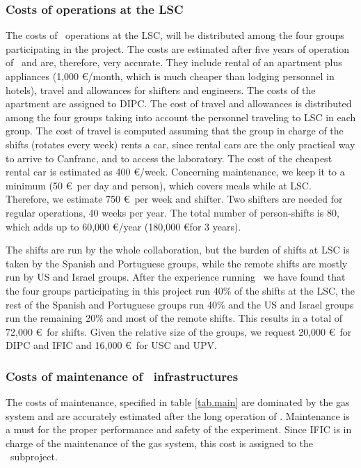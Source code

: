 \subsubsection{Costs of operations at the LSC}
The costs of \Next\ operations at the LSC, will be distributed among the four groups participating in the project. The costs are estimated after five years of operation of \New\ and are, therefore, very accurate. They include rental of an apartment plus appliances (1,000 \euro/month, which is much cheaper than lodging personnel in hotels), travel and allowances for shifters and engineers.  The costs of the apartment are assigned to DIPC. The cost of travel and allowances is distributed among the four groups taking into account the personnel traveling to LSC in each group. The cost of travel is computed assuming that the group in charge of the shifts (rotates every week) rents a car, since rental cars are the only practical way to arrive to Canfranc, and to access the laboratory. The cost of the cheapest rental car is estimated as 400 \euro/week. Concerning maintenance, we keep it to a minimum (50 \euro\ per day and person), which covers meals while at LSC. Therefore, we estimate 750 \euro\ per week and shifter. Two shifters are needed for regular operations, 40 weeks per year. The total number of person-shifts is 80, which adds up to 60,000 \euro/year (180,000 \euro for 3 years).

The shifts are run by the whole collaboration, but the burden of shifts at LSC is taken by the Spanish and Portuguese groups, while the remote shifts are mostly run by US and Israel groups. After the experience running \NEW\, we have found that the four groups participating in this project run 40\% of the shifts at the LSC, the rest of the Spanish and Portuguese groups run 40\% and the US and Israel groups run the remaining 20\% and most of the remote shifts. This results in a total of 
72,000 \euro\ for shifts. Given the relative size of the groups, we request 20,000 \euro\ for DIPC and IFIC and 16,000 \euro\ for USC and UPV.

\subsubsection{Costs of maintenance of \Next\ infrastructures}

The costs of maintenance, specified in table \ref{tab.main} are dominated by the gas system and are accurately estimated after the long operation of \NEW. Maintenance is a must for the proper performance and safety of the experiment. Since IFIC is in charge of the maintenance of the gas system, this cost is assigned to the \sIFIC\ subproject.

